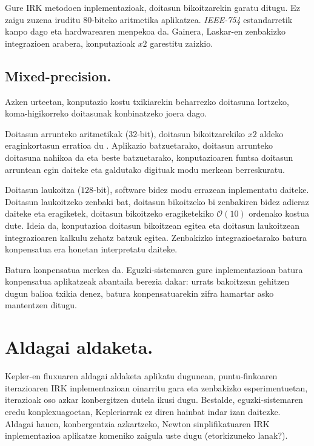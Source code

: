 Gure IRK metodoen inplementazioak, doitasun bikoitzarekin garatu ditugu. Ez zaigu zuzena iruditu $80$-biteko aritmetika aplikatzea. \emph{IEEE-754} estandarretik kanpo dago eta hardwarearen menpekoa da. Gainera, Laskar-en \cite{Laskar2011} zenbakizko integrazioen arabera, konputazioak $x2$ garestitu zaizkio. 


\subsection*{Mixed-precision.}


Azken urteetan, konputazio kostu txikiarekin beharrezko doitasuna lortzeko, koma-higikorreko doitasunak konbinatzeko joera dago.

Doitasun arrunteko aritmetikak ($32$-bit), doitasun bikoitzarekiko $x2$ aldeko eraginkortasun erratioa  du \cite{Dongarra2017}. Aplikazio batzuetarako, doitasun arrunteko doitasuna nahikoa da eta beste batzuetarako, konputazioaren funtsa doitasun arruntean egin daiteke eta galdutako digituak modu merkean berreskuratu.

Doitasun laukoitza ($128$-bit), software bidez modu errazean  inplementatu daiteke. Doitasun laukoitzeko zenbaki bat, doitasun bikoitzeko bi zenbakiren bidez adieraz daiteke eta eragiketek, doitasun bikoitzeko eragiketekiko $\mathcal{O}(10)$ ordenako kostua dute. Ideia da, konputazioa doitasun bikoitzean egitea eta doitasun laukoitzean integrazioaren kalkulu zehatz batzuk egitea. Zenbakizko integrazioetarako batura konpensatua era honetan interpretatu daiteke. 

Batura konpensatua merkea da. Eguzki-sistemaren gure inplementazioan batura konpensatua aplikatzeak abantaila berezia dakar: urrats bakoitzean gehitzen dugun balioa txikia denez, batura konpensatuarekin zifra hamartar asko mantentzen ditugu.            


\section{Aldagai aldaketa.}


Kepler-en fluxuaren aldagai aldaketa aplikatu dugunean, puntu-finkoaren iterazioaren IRK inplementazioan oinarritu gara eta zenbakizko esperimentuetan, iterazioak oso azkar konbergitzen dutela ikusi dugu. Bestalde, eguzki-sistemaren eredu konplexuagoetan, Kepleriarrak ez diren hainbat indar izan daitezke. Aldagai hauen, konbergentzia azkartzeko, Newton sinplifikatuaren IRK inplementazioa aplikatze komeniko zaigula uste dugu (etorkizuneko lanak?).

